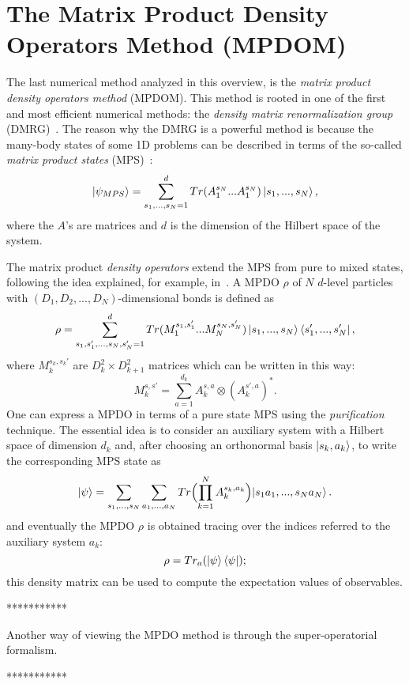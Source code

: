 \section{The Matrix Product Density Operators Method (MPDOM)}
The last numerical method analyzed in this overview, is the \emph{matrix product density operators method} (MPDOM).
This method is rooted in one of the first and most efficient numerical methods: the \emph{density matrix renormalization group} (DMRG)~\cite{s_white:dmrg}. The reason why the DMRG is a powerful method is because the many-body states of some 1D problems can be described in terms of the so-called \emph{matrix product states} (MPS)~\cite{PhysRevLett.93.207204, PhysRevLett:from_dmrg_to_mps}:
\begin{equation}
    \ket{\psi_{MPS}} = \sum_{s_1, ..., s_N = 1}^{d} Tr(A_1^{s_N}...A_1^{s_N}) \ket{s_1,...,s_N},
\end{equation}
where the $A$'s are matrices and $d$ is the dimension of the Hilbert space of the system. 

The matrix product \emph{density operators} extend the MPS from pure to mixed states, following the idea explained, for example, in~\cite{PhysRevLett.93.207204}. A MPDO $\rho$ of $N$ $d$-level particles with $(D_1, D_2, ..., D_N)$-dimensional bonds is defined as
\begin{equation}
    \rho = \sum_{s_1,s_1', ... ,s_N,s_N' = 1}^{d} Tr(M_1^{s_1,s_1'} ... M_N^{s_N,s_N'}) \ket{s_1, ... ,s_N}\bra{s'_1, ... ,s'_N},
\end{equation}
where $M_k^{s_k,s_k'}$ are $D_k^2 \times D_{k+1}^2$ matrices which can be written in this way:
\begin{equation}
    M_k^{s,s'} = \sum_{a = 1}^{d_k} A_k^{s,a} \otimes (A_k^{s',a})^*.
\end{equation}
One can express a MPDO in terms of a pure state MPS using the \emph{purification}~\cite{nielsen_chuang} technique. The essential idea is to consider an auxiliary system with a Hilbert space of dimension $d_k$ and, after choosing an orthonormal basis $\ket{s_k, a_k}$, to write the corresponding MPS state as
\begin{equation}
    \ket{\psi} = \sum_{s_1,...,s_N} \sum_{a_1, ..., a_N} Tr\Bigl(\prod_{k=1}^N A_k^{s_k, a_k}\Bigl) \ket{s_1a_1, ..., s_Na_N}.
\end{equation}
and eventually the MPDO $\rho$ is obtained tracing over the indices referred to the auxiliary system $a_k$:
\begin{equation}
    \rho = Tr_a(\ket{\psi}\bra{\psi});
\end{equation}
this density matrix can be used to compute the expectation values of observables.

***********

Another way of viewing the MPDO method is through the super-operatorial formalism.~\cite{PhysRevLett.93.207205}


***********